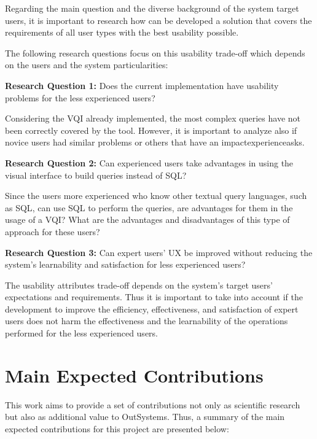 Regarding the main question and the diverse background of the system target users, it is important to research how can be developed a solution that covers the requirements of all user types with the best usability possible.

The following research questions focus on this usability trade-off which depends on the users and the system particularities:


\textbf{Research Question 1:} Does the current implementation have usability problems for the less experienced users?


Considering the \gls{VQI} already implemented, the most complex queries have not been correctly covered by the tool. However, it is important to analyze also if novice users had similar problems or others that have an impactexperienceasks.


\textbf{Research Question 2:} Can experienced users take advantages in using the visual interface to build queries instead of \gls{SQL}?


Since the users more experienced who know other textual query languages, such as \gls{SQL}, can use \gls{SQL} to perform the queries, are advantages for them in the usage of a \gls{VQI}? What are the advantages and disadvantages of this type of approach for these users?


\textbf{Research Question 3:} Can expert users' \gls{UX} be improved without reducing the system's learnability and satisfaction for less experienced users?



The usability attributes trade-off depends on the system's target users' expectations and requirements. Thus it is important to take into account if the development to improve the efficiency, effectiveness, and satisfaction of expert users does not harm the effectiveness and the learnability of the operations performed for the less experienced users.

\section{Main Expected Contributions}
\label{sec:main_exp_contributions}
This work aims to provide a set of contributions not only as scientific research but also as additional value to OutSystems. Thus, a summary of the main expected contributions for this project are presented below:


